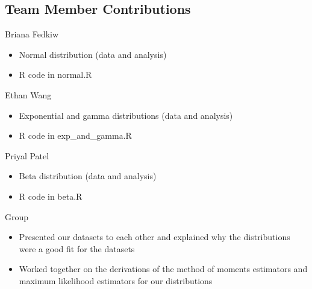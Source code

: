 \documentclass[12pt, letterpaper]{article}
\begin{document}
\newpage
\begin{center}
    \section*{Team Member Contributions}
\end{center}

\normalsize
Briana Fedkiw
\begin{itemize}[leftmargin=50pt]
  \item Normal distribution (data and analysis)
  \item R code in normal.R
\end{itemize}

Ethan Wang
\begin{itemize}[leftmargin=50pt]
  \item Exponential and gamma distributions (data and analysis)
  \item R code in exp\_and\_gamma.R
\end{itemize}

Priyal Patel
\begin{itemize}[leftmargin=50pt]
  \item Beta distribution (data and analysis)
  \item R code in beta.R
\end{itemize}

Group
\begin{itemize}[leftmargin=50pt]
  \item Presented our datasets to each other and explained why the distributions were a good fit for the datasets
  \item Worked together on the derivations of the method of moments estimators and maximum likelihood estimators for our distributions
\end{itemize}
\end{document}

